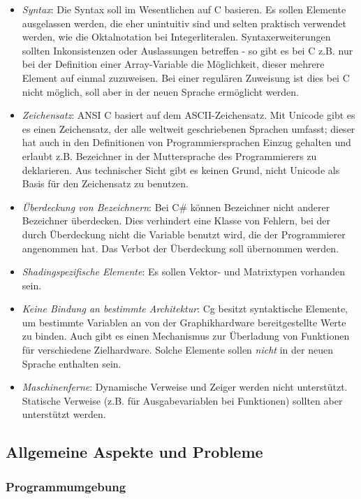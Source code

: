 \begin{itemize}
\item \emph{Syntax}: Die Syntax soll im Wesentlichen auf C basieren. Es sollen Elemente ausgelassen werden, die eher 
unintuitiv sind und selten praktisch verwendet werden, wie die Oktalnotation bei Integerliteralen.
Syntaxerweiterungen sollten Inkonsistenzen oder Auslassungen betreffen - so gibt es bei C z.B. 
nur bei der Definition einer Array-Variable die Möglichkeit, dieser mehrere Element auf einmal zuzuweisen.
Bei einer regulären Zuweisung ist dies bei C nicht möglich, soll aber in der neuen Sprache ermöglicht werden.
\item \emph{Zeichensatz}: ANSI C basiert auf dem ASCII-Zeichensatz. %
Mit Unicode gibt es es einen Zeichensatz, der alle weltweit geschriebenen Sprachen umfasst; dieser
hat auch in den Definitionen von Programmiersprachen Einzug gehalten %
und erlaubt z.B. Bezeichner in der Muttersprache des Programmierers zu deklarieren.
Aus technischer Sicht gibt es keinen Grund, nicht Unicode als Basis für den Zeichensatz zu benutzen.
\item \emph{Überdeckung von Bezeichnern}: Bei C\# können Bezeichner nicht anderer Bezeichner überdecken. Dies
verhindert eine Klasse von Fehlern, bei der durch Überdeckung nicht die Variable benutzt wird, die der
Programmierer angenommen hat. Das Verbot der Überdeckung soll übernommen werden.
\item \emph{Shadingspezifische Elemente}: Es sollen Vektor- und Matrixtypen vorhanden sein.
\item \emph{Keine Bindung an bestimmte Architektur}: Cg besitzt syntaktische Elemente, um bestimmte Variablen an
von der Graphikhardware bereitgestellte Werte zu binden. Auch gibt es einen Mechanismus zur Überladung von Funktionen
für verschiedene Zielhardware. Solche Elemente sollen \emph{nicht} in der neuen Sprache enthalten sein.
\item \emph{Maschinenferne}: Dynamische Verweise und 
Zeiger werden nicht unterstützt. Statische Verweise (z.B. für Ausgabevariablen bei Funktionen) sollten aber unterstützt
werden.
\end{itemize}

\newpage

\subsection{Allgemeine Aspekte und Probleme}

\subsubsection{Programmumgebung}

